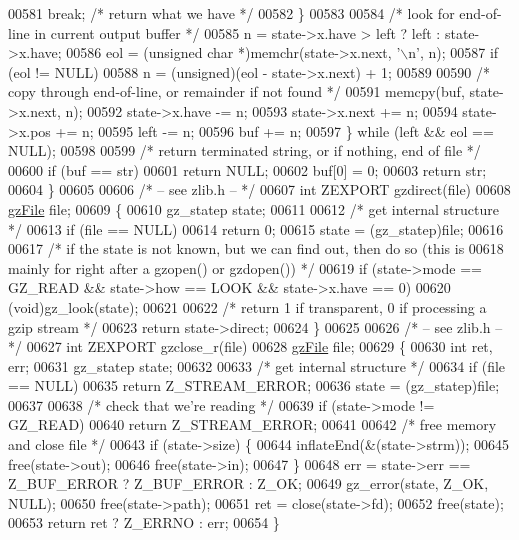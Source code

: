 \begin{DoxyCode}
00581             \textcolor{keywordflow}{break};                      \textcolor{comment}{/* return what we have */}
00582         \}
00583 
00584         \textcolor{comment}{/* look for end-of-line in current output buffer */}
00585         n = state->x.have > left ? left : state->x.have;
00586         eol = (\textcolor{keywordtype}{unsigned} \textcolor{keywordtype}{char} *)memchr(state->x.next, \textcolor{charliteral}{'\(\backslash\)n'}, n);
00587         \textcolor{keywordflow}{if} (eol != NULL)
00588             n = (unsigned)(eol - state->x.next) + 1;
00589 
00590         \textcolor{comment}{/* copy through end-of-line, or remainder if not found */}
00591         memcpy(buf, state->x.next, n);
00592         state->x.have -= n;
00593         state->x.next += n;
00594         state->x.pos += n;
00595         left -= n;
00596         buf += n;
00597     \} \textcolor{keywordflow}{while} (left && eol == NULL);
00598 
00599     \textcolor{comment}{/* return terminated string, or if nothing, end of file */}
00600     \textcolor{keywordflow}{if} (buf == str)
00601         \textcolor{keywordflow}{return} NULL;
00602     buf[0] = 0;
00603     \textcolor{keywordflow}{return} str;
00604 \}
00605 
00606 \textcolor{comment}{/* -- see zlib.h -- */}
00607 \textcolor{keywordtype}{int} ZEXPORT gzdirect(file)
00608     \hyperlink{structgz_file__s}{gzFile} file;
00609 \{
00610     gz\_statep state;
00611 
00612     \textcolor{comment}{/* get internal structure */}
00613     \textcolor{keywordflow}{if} (file == NULL)
00614         \textcolor{keywordflow}{return} 0;
00615     state = (gz\_statep)file;
00616 
00617     \textcolor{comment}{/* if the state is not known, but we can find out, then do so (this is}
00618 \textcolor{comment}{       mainly for right after a gzopen() or gzdopen()) */}
00619     \textcolor{keywordflow}{if} (state->mode == GZ\_READ && state->how == LOOK && state->x.have == 0)
00620         (void)gz\_look(state);
00621 
00622     \textcolor{comment}{/* return 1 if transparent, 0 if processing a gzip stream */}
00623     \textcolor{keywordflow}{return} state->direct;
00624 \}
00625 
00626 \textcolor{comment}{/* -- see zlib.h -- */}
00627 \textcolor{keywordtype}{int} ZEXPORT gzclose\_r(file)
00628     \hyperlink{structgz_file__s}{gzFile} file;
00629 \{
00630     \textcolor{keywordtype}{int} ret, err;
00631     gz\_statep state;
00632 
00633     \textcolor{comment}{/* get internal structure */}
00634     \textcolor{keywordflow}{if} (file == NULL)
00635         \textcolor{keywordflow}{return} Z\_STREAM\_ERROR;
00636     state = (gz\_statep)file;
00637 
00638     \textcolor{comment}{/* check that we're reading */}
00639     \textcolor{keywordflow}{if} (state->mode != GZ\_READ)
00640         \textcolor{keywordflow}{return} Z\_STREAM\_ERROR;
00641 
00642     \textcolor{comment}{/* free memory and close file */}
00643     \textcolor{keywordflow}{if} (state->size) \{
00644         inflateEnd(&(state->strm));
00645         free(state->out);
00646         free(state->in);
00647     \}
00648     err = state->err == Z\_BUF\_ERROR ? Z\_BUF\_ERROR : Z\_OK;
00649     gz\_error(state, Z\_OK, NULL);
00650     free(state->path);
00651     ret = close(state->fd);
00652     free(state);
00653     \textcolor{keywordflow}{return} ret ? Z\_ERRNO : err;
00654 \}
\end{DoxyCode}
